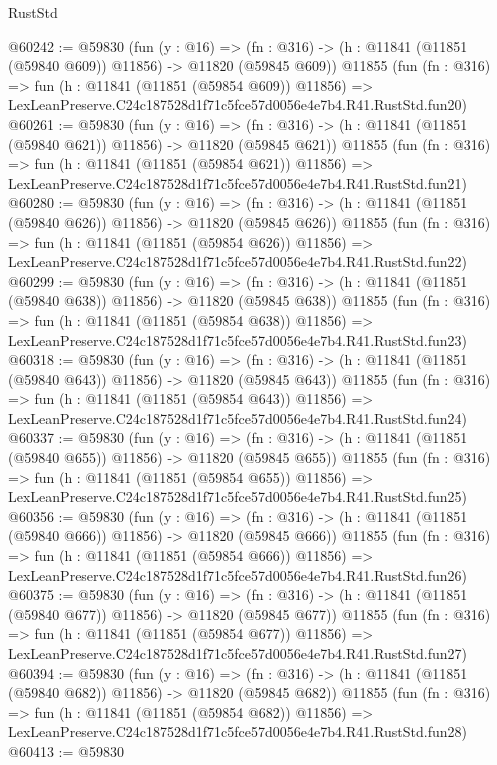 \begin{lexlean}{RustStd}
\begin{coremodule}
@60242 := @59830
    (fun (y : @16) =>
    (fn : @316) -> (h : @11841 (@11851 (@59840 @609)) @11856) -> @11820 (@59845 @609))
    @11855
    (fun (fn : @316) =>
    fun (h : @11841 (@11851 (@59854 @609)) @11856) =>
    LexLeanPreserve.C24c187528d1f71c5fce57d0056e4e7b4.R41.RustStd.fun20)
@60261 := @59830
    (fun (y : @16) =>
    (fn : @316) -> (h : @11841 (@11851 (@59840 @621)) @11856) -> @11820 (@59845 @621))
    @11855
    (fun (fn : @316) =>
    fun (h : @11841 (@11851 (@59854 @621)) @11856) =>
    LexLeanPreserve.C24c187528d1f71c5fce57d0056e4e7b4.R41.RustStd.fun21)
@60280 := @59830
    (fun (y : @16) =>
    (fn : @316) -> (h : @11841 (@11851 (@59840 @626)) @11856) -> @11820 (@59845 @626))
    @11855
    (fun (fn : @316) =>
    fun (h : @11841 (@11851 (@59854 @626)) @11856) =>
    LexLeanPreserve.C24c187528d1f71c5fce57d0056e4e7b4.R41.RustStd.fun22)
@60299 := @59830
    (fun (y : @16) =>
    (fn : @316) -> (h : @11841 (@11851 (@59840 @638)) @11856) -> @11820 (@59845 @638))
    @11855
    (fun (fn : @316) =>
    fun (h : @11841 (@11851 (@59854 @638)) @11856) =>
    LexLeanPreserve.C24c187528d1f71c5fce57d0056e4e7b4.R41.RustStd.fun23)
@60318 := @59830
    (fun (y : @16) =>
    (fn : @316) -> (h : @11841 (@11851 (@59840 @643)) @11856) -> @11820 (@59845 @643))
    @11855
    (fun (fn : @316) =>
    fun (h : @11841 (@11851 (@59854 @643)) @11856) =>
    LexLeanPreserve.C24c187528d1f71c5fce57d0056e4e7b4.R41.RustStd.fun24)
@60337 := @59830
    (fun (y : @16) =>
    (fn : @316) -> (h : @11841 (@11851 (@59840 @655)) @11856) -> @11820 (@59845 @655))
    @11855
    (fun (fn : @316) =>
    fun (h : @11841 (@11851 (@59854 @655)) @11856) =>
    LexLeanPreserve.C24c187528d1f71c5fce57d0056e4e7b4.R41.RustStd.fun25)
@60356 := @59830
    (fun (y : @16) =>
    (fn : @316) -> (h : @11841 (@11851 (@59840 @666)) @11856) -> @11820 (@59845 @666))
    @11855
    (fun (fn : @316) =>
    fun (h : @11841 (@11851 (@59854 @666)) @11856) =>
    LexLeanPreserve.C24c187528d1f71c5fce57d0056e4e7b4.R41.RustStd.fun26)
@60375 := @59830
    (fun (y : @16) =>
    (fn : @316) -> (h : @11841 (@11851 (@59840 @677)) @11856) -> @11820 (@59845 @677))
    @11855
    (fun (fn : @316) =>
    fun (h : @11841 (@11851 (@59854 @677)) @11856) =>
    LexLeanPreserve.C24c187528d1f71c5fce57d0056e4e7b4.R41.RustStd.fun27)
@60394 := @59830
    (fun (y : @16) =>
    (fn : @316) -> (h : @11841 (@11851 (@59840 @682)) @11856) -> @11820 (@59845 @682))
    @11855
    (fun (fn : @316) =>
    fun (h : @11841 (@11851 (@59854 @682)) @11856) =>
    LexLeanPreserve.C24c187528d1f71c5fce57d0056e4e7b4.R41.RustStd.fun28)
@60413 := @59830

\end{coremodule}
\end{lexlean}
